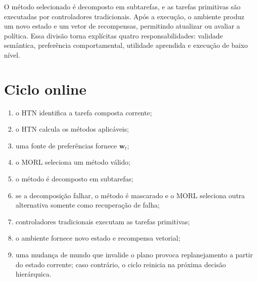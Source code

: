 O método selecionado é decomposto em subtarefas, e as tarefas primitivas são
executadas por controladores tradicionais.
Após a execução, o ambiente produz um novo estado e um vetor de recompensas,
permitindo atualizar ou avaliar a política.
Essa divisão torna explícitas quatro responsabilidades: validade semântica,
preferência comportamental, utilidade aprendida e execução de baixo nível.



\section{Ciclo online}

\begin{enumerate}
\item o HTN identifica a tarefa composta corrente;
\item o HTN calcula os métodos aplicáveis;
\item uma fonte de preferências fornece $\mathbf{w}_t$;
\item o MORL seleciona um método válido;
\item o método é decomposto em subtarefas;
\item se a decomposição falhar, o método é mascarado e o MORL seleciona outra
alternativa somente como recuperação de falha;
\item controladores tradicionais executam as tarefas primitivas;
\item o ambiente fornece novo estado e recompensa vetorial;
\item uma mudança de mundo que invalide o plano provoca replanejamento a partir
do estado corrente; caso contrário, o ciclo reinicia na próxima decisão
hierárquica.
\end{enumerate}

